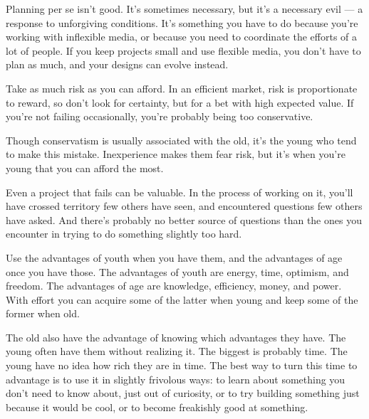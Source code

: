 Planning per se isn't good. It's sometimes
                  necessary, but it's a necessary evil --- a response to
                  unforgiving conditions. It's something you have to do because
                  you're working with inflexible media, or because you need to
                  coordinate the efforts of a lot of people. If you keep
                  projects small and use flexible media, you don't have to plan
                  as much, and your designs can evolve instead.






                  Take as much risk as you can afford. In an efficient market,
                  risk is proportionate to reward, so don't look for certainty,
                  but for a bet with high expected value. If you're not failing
                  occasionally, you're probably being too conservative.

Though
                  conservatism is usually associated with the old, it's the
                  young who tend to make this mistake. Inexperience makes them
                  fear risk, but it's when you're young that you can afford the
                  most.

Even a project that fails can be valuable. In
                  the process of working on it, you'll have crossed territory
                  few others have seen, and encountered questions few others
                  have asked. And there's probably no better source of questions
                  than the ones you encounter in trying to do something slightly
                  too hard.






                  Use the advantages of youth when you have them, and the
                  advantages of age once you have those. The advantages of youth
                  are energy, time, optimism, and freedom. The advantages of age
                  are knowledge, efficiency, money, and power. With effort you
                  can acquire some of the latter when young and keep some of the
                  former when old.

The old also have the advantage of
                  knowing which advantages they have. The young often have them
                  without realizing it. The biggest is probably time. The young
                  have no idea how rich they are in time. The best way to turn
                  this time to advantage is to use it in slightly frivolous
                  ways: to learn about something you don't need to know about,
                  just out of curiosity, or to try building something just
                  because it would be cool, or to become freakishly good at
                  something.

